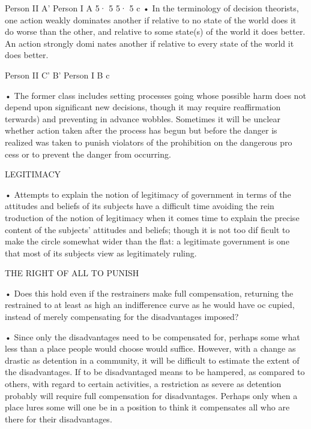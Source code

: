 \documentclass[11pt,openany]{book}
\begin{document}
{\footnotesize\setlength{\parindent}{0pt}\setlength{\parskip}{5pt}

Person II A' Person I A 5· 5 5· 5 c • In the terminology of decision theorists, one action weakly dominates another if relative to no state of the world does it do worse than the other, and relative to some state(s) of the world it does better. An action strongly domi nates another if relative to every state of the world it does better.\par

Person II C' B' Person I B c\par

• The former class includes setting processes going whose possible harm does not depend upon significant new decisions, though it may require reaffirmation terwards) and preventing in advance wobbles. Sometimes it will be unclear whether action taken after the process has begun but before the danger is realized was taken to punish violators of the prohibition on the dangerous pro cess or to prevent the danger from occurring.\par

LEGITIMACY\par

• Attempts to explain the notion of legitimacy of government in terms of the attitudes and beliefs of its subjects have a difficult time avoiding the rein troduction of the notion of legitimacy when it comes time to explain the precise content of the subjects' attitudes and beliefs; though it is not too dif ficult to make the circle somewhat wider than the flat: a legitimate government is one that most of its subjects view as legitimately ruling.\par

THE RIGHT OF ALL TO PUNISH\par

• Does this hold even if the restrainers make full compensation, returning the restrained to at least as high an indifference curve as he would have oc cupied, instead of merely compensating for the disadvantages imposed?\par

• Since only the disadvantages need to be compensated for, perhaps some what less than a place people would choose would suffice. However, with a change as drastic as detention in a community, it will be difficult to estimate the extent of the disadvantages. If to be disadvantaged means to be hampered, as compared to others, with regard to certain activities, a restriction as severe as detention probably will require full compensation for disadvantages. Perhaps only when a place lures some will one be in a position to think it compensates all who are there for their disadvantages.\par

}
\end{document}
